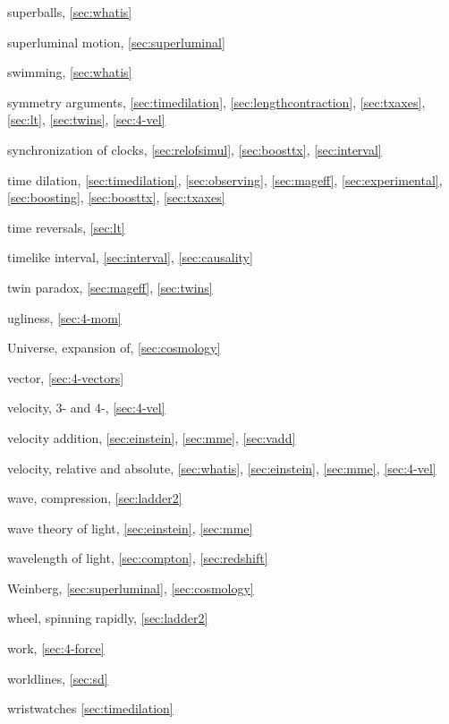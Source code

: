 \begin{theindex}
\item superballs, \ref{sec:whatis}
\item superluminal motion, \ref{sec:superluminal}
\item swimming, \ref{sec:whatis}
\item symmetry arguments, \ref{sec:timedilation}, \ref{sec:lengthcontraction},
	\ref{sec:txaxes}, \ref{sec:lt}, \ref{sec:twins}, \ref{sec:4-vel}
\item synchronization of clocks, \ref{sec:relofsimul}, \ref{sec:boosttx},
	\ref{sec:interval}
\item time dilation, \ref{sec:timedilation}, \ref{sec:observing},
	\ref{sec:mageff}, \ref{sec:experimental}, \ref{sec:boosting},
	\ref{sec:boosttx}, \ref{sec:txaxes}
\item time reversals, \ref{sec:lt}
\item timelike interval, \ref{sec:interval}, \ref{sec:causality}
\item twin paradox, \ref{sec:mageff}, \ref{sec:twins}
\item ugliness, \ref{sec:4-mom}
\item Universe, expansion of, \ref{sec:cosmology}
\item vector, \ref{sec:4-vectors}
\item velocity, 3- and 4-, \ref{sec:4-vel}
\item velocity addition, \ref{sec:einstein}, \ref{sec:mme}, \ref{sec:vadd}
\item velocity, relative and absolute, \ref{sec:whatis}, \ref{sec:einstein},
	\ref{sec:mme}, \ref{sec:4-vel}
\item wave, compression, \ref{sec:ladder2}
\item wave theory of light, \ref{sec:einstein}, \ref{sec:mme}
\item wavelength of light, \ref{sec:compton}, \ref{sec:redshift}
\item Weinberg, \ref{sec:superluminal}, \ref{sec:cosmology}
\item wheel, spinning rapidly, \ref{sec:ladder2}
\item work, \ref{sec:4-force}
\item worldlines, \ref{sec:sd}
\item wristwatches \ref{sec:timedilation}
\end{theindex}
